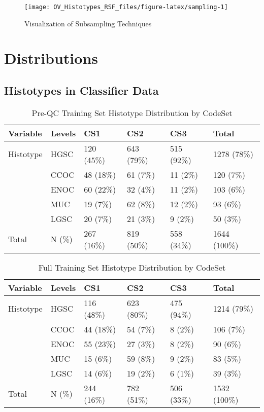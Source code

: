 \documentclass[
]{report}
\begin{document}
\begin{figure}[H]

{\centering \texttt{[image: OV\_Histotypes\_RSF\_files/figure-latex/sampling-1]} 

}

\caption{Visualization of Subsampling Techniques}\label{fig:sampling}
\end{figure}

\hypertarget{distributions}{%
\chapter{Distributions}\label{distributions}}

\hypertarget{histotypes-in-classifier-data}{%
\section{Histotypes in Classifier Data}\label{histotypes-in-classifier-data}}

\begin{table}

\caption{\label{tab:preqc-hist-codeset}Pre-QC Training Set Histotype Distribution by CodeSet}
\centering
\begin{tabular}[t]{l|l|l|l|l|l}
\hline
Variable & Levels & CS1 & CS2 & CS3 & Total\\
\hline
Histotype & HGSC & 120 (45\%) & 643 (79\%) & 515 (92\%) & 1278 (78\%)\\
\hline
 & CCOC & 48 (18\%) & 61 (7\%) & 11 (2\%) & 120 (7\%)\\
\hline
 & ENOC & 60 (22\%) & 32 (4\%) & 11 (2\%) & 103 (6\%)\\
\hline
 & MUC & 19 (7\%) & 62 (8\%) & 12 (2\%) & 93 (6\%)\\
\hline
 & LGSC & 20 (7\%) & 21 (3\%) & 9 (2\%) & 50 (3\%)\\
\hline
Total & N (\%) & 267 (16\%) & 819 (50\%) & 558 (34\%) & 1644 (100\%)\\
\hline
\end{tabular}
\end{table}

\begin{table}

\caption{\label{tab:train-hist-codeset}Full Training Set Histotype Distribution by CodeSet}
\centering
\begin{tabular}[t]{l|l|l|l|l|l}
\hline
Variable & Levels & CS1 & CS2 & CS3 & Total\\
\hline
Histotype & HGSC & 116 (48\%) & 623 (80\%) & 475 (94\%) & 1214 (79\%)\\
\hline
 & CCOC & 44 (18\%) & 54 (7\%) & 8 (2\%) & 106 (7\%)\\
\hline
 & ENOC & 55 (23\%) & 27 (3\%) & 8 (2\%) & 90 (6\%)\\
\hline
 & MUC & 15 (6\%) & 59 (8\%) & 9 (2\%) & 83 (5\%)\\
\hline
 & LGSC & 14 (6\%) & 19 (2\%) & 6 (1\%) & 39 (3\%)\\
\hline
Total & N (\%) & 244 (16\%) & 782 (51\%) & 506 (33\%) & 1532 (100\%)\\
\hline
\end{tabular}
\end{table}
\end{document}
